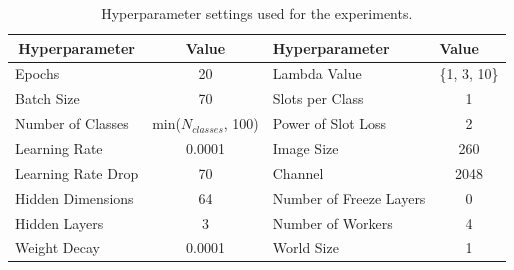 \begin{table}[!ht]
\centering
\begin{tabular}{lc|lc}
\hline
\multicolumn{1}{c}{\textbf{Hyperparameter}} & \textbf{Value}           & \textbf{Hyperparameter} & \multicolumn{1}{l}{\textbf{Value}} \\ \hline
Epochs                                      & 20                       & Lambda Value            & \{1, 3, 10\}       \\
Batch Size                                  & 70                       & Slots per Class         & 1                                  \\
Number of Classes                           & min($N_{classes}$, 100) & Power of Slot Loss      & 2                                  \\
Learning Rate                               & 0.0001                   & Image Size              & 260                                \\
Learning Rate Drop                          & 70                       & Channel                 & 2048                               \\
Hidden Dimensions                           & 64                       & Number of Freeze Layers & 0                                  \\
Hidden Layers                               & 3                        & Number of Workers       & 4                                  \\
Weight Decay                                & 0.0001                   & World Size              & 1                                  \\ \hline
\end{tabular}
\caption{Hyperparameter settings used for the experiments.}
\label{tab:hyperparams}
\end{table}

